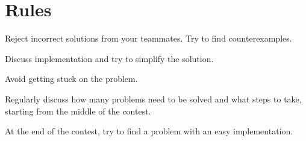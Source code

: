 \section*{Rules}
Reject incorrect solutions from your teammates. Try to find counterexamples.

Discuss implementation and try to simplify the solution.

Avoid getting stuck on the problem.

Regularly discuss how many problems need to be solved and what steps to take, starting from the middle of the contest.

At the end of the contest, try to find a problem with an easy implementation.